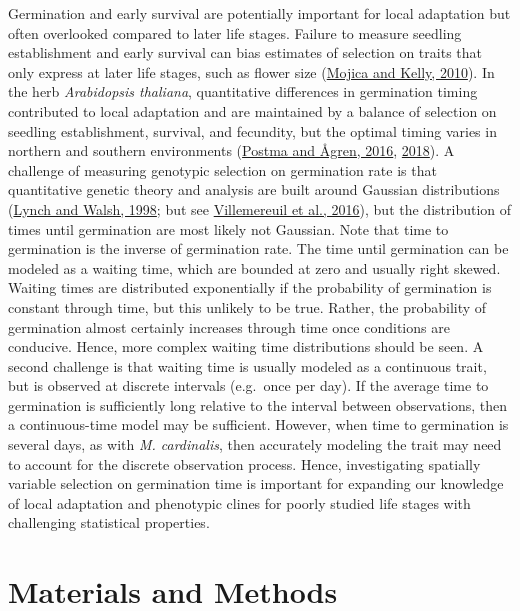 \documentclass[
  12pt,
]{article}
\begin{document}
Germination and early survival are potentially important for local adaptation but often overlooked compared to later life stages. Failure to measure seedling establishment and early survival can bias estimates of selection on traits that only express at later life stages, such as flower size (\protect\hyperlink{ref-mojica_viability_2010}{Mojica and Kelly, 2010}). In the herb \emph{Arabidopsis thaliana}, quantitative differences in germination timing contributed to local adaptation and are maintained by a balance of selection on seedling establishment, survival, and fecundity, but the optimal timing varies in northern and southern environments (\protect\hyperlink{ref-postma_early_2016}{Postma and Ågren, 2016}, \protect\hyperlink{ref-postma_among-year_2018}{2018}). A challenge of measuring genotypic selection on germination rate is that quantitative genetic theory and analysis are built around Gaussian distributions (\protect\hyperlink{ref-lynch_genetics_1998}{Lynch and Walsh, 1998}; but see \protect\hyperlink{ref-de_villemereuil_general_2016}{Villemereuil et al., 2016}), but the distribution of times until germination are most likely not Gaussian. Note that time to germination is the inverse of germination rate. The time until germination can be modeled as a waiting time, which are bounded at zero and usually right skewed. Waiting times are distributed exponentially if the probability of germination is constant through time, but this unlikely to be true. Rather, the probability of germination almost certainly increases through time once conditions are conducive. Hence, more complex waiting time distributions should be seen. A second challenge is that waiting time is usually modeled as a continuous trait, but is observed at discrete intervals (e.g.~once per day). If the average time to germination is sufficiently long relative to the interval between observations, then a continuous-time model may be sufficient. However, when time to germination is several days, as with \emph{M. cardinalis}, then accurately modeling the trait may need to account for the discrete observation process. Hence, investigating spatially variable selection on germination time is important for expanding our knowledge of local adaptation and phenotypic clines for poorly studied life stages with challenging statistical properties.

\hypertarget{materials-and-methods}{%
\section{Materials and Methods}\label{materials-and-methods}}
\end{document}
